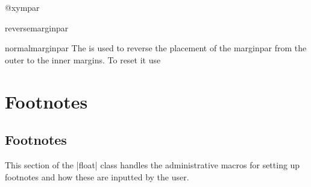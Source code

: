%
 \begin{docCommand}{@xympar} {}
    \begin{teX}
\def \@xympar{%
  \ifnum\@floatpenalty <\z@\@cons\@currlist\@marbox\fi
  \setbox\@tempboxa
    \color@vbox
      \vbox \bgroup
  \end@float
  \@ignorefalse
  \@esphack
}
    \end{teX}
 \end{docCommand}
%
 \begin{docCommand}{reversemarginpar} {}
 \begin{docCommand}{normalmarginpar} {}
 The \CMDI{\reversemarginpar} is used to reverse the placement of the marginpar from
 the outer to the inner margins. To reset it use \CMDI{\normalmarginpar}
    \begin{teX}
\def\reversemarginpar{\global\@mparbottom\z@ \@reversemargintrue}
\def\normalmarginpar{\global\@mparbottom\z@ \@reversemarginfalse}
    \end{teX}
 \end{docCommand}
 \end{docCommand}
%
\section{Footnotes}

    \begin{teX}
    \end{teX}
%
 \subsection{Footnotes}
%
This section of the |float| class handles the administrative macros for setting up footnotes
and how these are inputted by the user.


